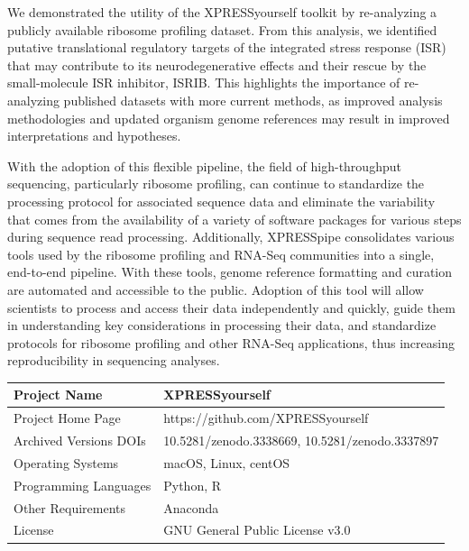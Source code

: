 \documentclass[10pt, oneside]{article}
\begin{document}
We demonstrated the utility of the XPRESSyourself toolkit by re-analyzing a publicly available ribosome profiling dataset. From this analysis, we identified putative translational regulatory targets of the integrated stress response (ISR) that may contribute to its neurodegenerative effects and their rescue by the small-molecule ISR inhibitor, ISRIB. This highlights the importance of re-analyzing published datasets with more current methods, as improved analysis methodologies and updated organism genome references may result in improved interpretations and hypotheses. \par

With the adoption of this flexible pipeline, the field of high-throughput sequencing, particularly ribosome profiling, can continue to standardize the processing protocol for associated sequence data and eliminate the variability that comes from the availability of a variety of software packages for various steps during sequence read processing. Additionally, XPRESSpipe consolidates various tools used by the ribosome profiling and RNA-Seq communities into a single, end-to-end pipeline. With these tools, genome reference formatting and curation are automated and accessible to the public. Adoption of this tool will allow scientists to process and access their data independently and quickly, guide them in understanding key considerations in processing their data, and standardize protocols for ribosome profiling and other RNA-Seq applications, thus increasing reproducibility in sequencing analyses. \\

\begin{table}[!]
    \centering
{}
\begin{tabular}{p{4cm}p{9cm}}
 Project Name & XPRESSyourself \\
 \hline
 Project Home Page & https://github.com/XPRESSyourself \\
 \hline
 Archived Versions DOIs & 10.5281/zenodo.3338669, 10.5281/zenodo.3337897 \\
 \hline
 Operating Systems & macOS, Linux, centOS \\
 \hline
 Programming Languages & Python, R \\
 \hline
 Other Requirements & Anaconda \\
 \hline
 License & GNU General Public License v3.0 \\
\end{tabular}
\end{table}
\end{document}
